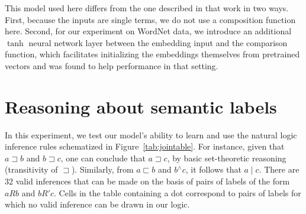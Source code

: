 \documentclass[letterpaper]{article}
\newcommand{\natneg}{\mathbin{^{\wedge}}}
\newcommand{\natfor}{\sqsubset}
\newcommand{\natrev}{\sqsupset}
\newcommand{\natalt}{\mathbin{|}}
\def\ii#1{\textit{#1}}
\begin{document}
This model used here differs from the one described in that work in
two ways. First, because the inputs are single terms, we do not use
a composition function here. Second, for our experiment on WordNet data, 
we introduce an additional $\tanh$ neural network layer between the embedding 
input and the comparison function, which facilitates initializing the 
embeddings themselves from pretrained vectors and was found to help 
performance in that setting.


\section{Reasoning about semantic labels}\label{sec:join}

In this experiment, we test our model's ability to learn and use the
natural logic inference rules schematized in
Figure~\ref{tab:jointable}. For instance, given that $a \natrev b$ and
$b \natrev c$, one can conclude that $a \natrev c$, by basic
set-theoretic reasoning (transitivity of $\natrev$). Similarly, from
$a \natfor b$ and $b \natneg c$, it follows that $a \natalt c$.  There
are 32 valid inferences that can be made on the basis of pairs of
labels of the form $a R b$ and $b R' c$. Cells in the table
containing a dot correspond to pairs of labels for which no valid
inference can be drawn in our logic.

\end{document}
